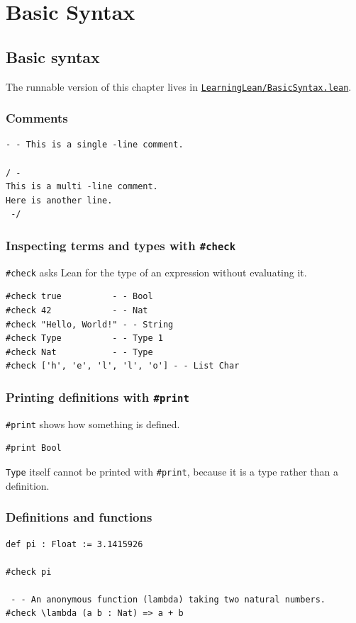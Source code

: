 \section{Basic Syntax}

\subsection{Basic syntax}

The runnable version of this chapter lives in
\href{/BasicSyntax-17b3beb7abc501549129aaa1412511b4.lean}{\texttt{LearningLean/BasicSyntax.lean}}.

\subsubsection{Comments}

\begin{verbatim}
- - This is a single -line comment.

/ -
This is a multi -line comment.
Here is another line.
 -/
\end{verbatim}

\subsubsection{Inspecting terms and types with \texttt{\#check}}

\texttt{\#check} asks Lean for the type of an expression without evaluating it.

\begin{verbatim}
#check true          - - Bool
#check 42            - - Nat
#check "Hello, World!" - - String
#check Type          - - Type 1
#check Nat           - - Type
#check ['h', 'e', 'l', 'l', 'o'] - - List Char
\end{verbatim}

\subsubsection{Printing definitions with \texttt{\#print}}

\texttt{\#print} shows how something is defined.

\begin{verbatim}
#print Bool
\end{verbatim}

\texttt{Type} itself cannot be printed with \texttt{\#print}, because it is a type rather than a
definition.

\subsubsection{Definitions and functions}

\begin{verbatim}
def pi : Float := 3.1415926

#check pi

 - - An anonymous function (lambda) taking two natural numbers.
#check \lambda (a b : Nat) => a + b
\end{verbatim}